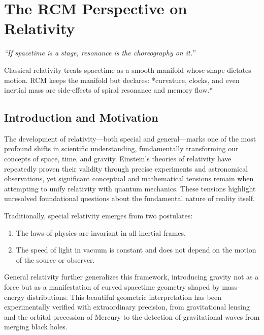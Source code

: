 \chapter{The RCM Perspective on Relativity}



\begin{center}
\emph{“If spacetime is a stage, resonance is the choreography on it.”}
\end{center}

\begin{concept}
Classical relativity treats spacetime as a smooth manifold whose shape
dictates motion.  
RCM keeps the manifold but declares: *curvature, clocks, and even inertial
mass are side-effects of spiral resonance and memory flow.*
\end{concept}

\section{Introduction and Motivation}
\label{sec:8.1-intro}

The development of relativity—both special and general—marks one of the most profound shifts in scientific understanding, fundamentally transforming our concepts of space, time, and gravity. Einstein’s theories of relativity have repeatedly proven their validity through precise experiments and astronomical observations, yet significant conceptual and mathematical tensions remain when attempting to unify relativity with quantum mechanics. These tensions highlight unresolved foundational questions about the fundamental nature of reality itself.

Traditionally, special relativity emerges from two postulates:
\begin{enumerate}
  \item The laws of physics are invariant in all inertial frames.
  \item The speed of light in vacuum is constant and does not depend on the motion of the source or observer.
\end{enumerate}
General relativity further generalizes this framework, introducing gravity not as a force but as a manifestation of curved spacetime geometry shaped by mass–energy distributions. This beautiful geometric interpretation has been experimentally verified with extraordinary precision, from gravitational lensing and the orbital precession of Mercury to the detection of gravitational waves from merging black holes.

